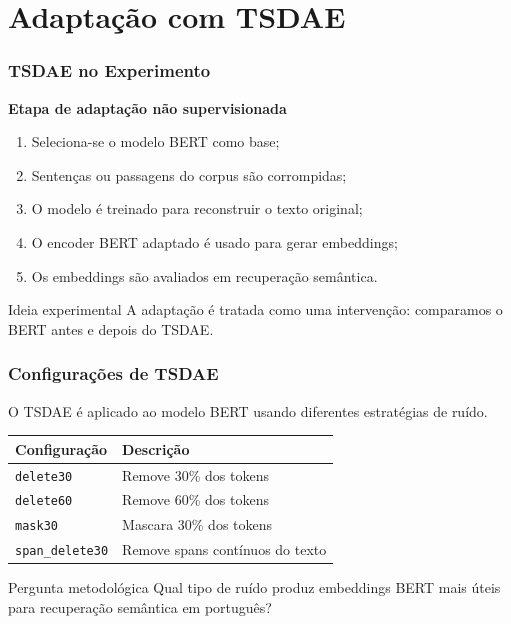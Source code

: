 \documentclass[aspectratio=169]{beamer}
\begin{document}
\section{Adaptação com TSDAE}

\begin{frame}
\frametitle{TSDAE no Experimento}

\textbf{Etapa de adaptação não supervisionada}

\vspace{0.25cm}

\begin{enumerate}
  \item Seleciona-se o modelo BERT como base;
  \item Sentenças ou passagens do corpus são corrompidas;
  \item O modelo é treinado para reconstruir o texto original;
  \item O encoder BERT adaptado é usado para gerar embeddings;
  \item Os embeddings são avaliados em recuperação semântica.
\end{enumerate}

\vspace{0.25cm}

\begin{alertblock}{Ideia experimental}
A adaptação é tratada como uma intervenção: comparamos o BERT antes e depois do TSDAE.
\end{alertblock}

\end{frame}

\begin{frame}
\frametitle{Configurações de TSDAE}

O TSDAE é aplicado ao modelo BERT usando diferentes estratégias de ruído.

\vspace{0.25cm}

\begin{table}
\centering
\small
\begin{tabular}{@{}ll@{}}
\toprule
\textbf{Configuração} & \textbf{Descrição} \\
\midrule
\texttt{delete30} & Remove 30\% dos tokens \\
\texttt{delete60} & Remove 60\% dos tokens \\
\texttt{mask30} & Mascara 30\% dos tokens \\
\texttt{span\_delete30} & Remove spans contínuos do texto \\
\bottomrule
\end{tabular}
\end{table}

\vspace{0.3cm}

\begin{alertblock}{Pergunta metodológica}
Qual tipo de ruído produz embeddings BERT mais úteis para recuperação semântica em português?
\end{alertblock}

\end{frame}
\end{document}
